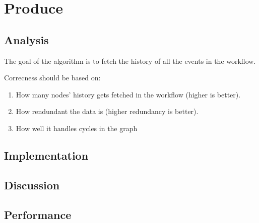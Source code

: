 \section{Produce}
\subsection{Analysis} %
The goal of the algorithm is to fetch the history of all the events in the workflow.

Correcness should be based on:
\begin{enumerate}
    \item How many nodes' history gets fetched in the workflow (higher is better).
    \item How rendundant the data is (higher redundancy is better).
    \item How well it handles cycles in the graph
\end{enumerate}

\subsection{Implementation} %
\subsection{Discussion} %
\subsection{Performance} %